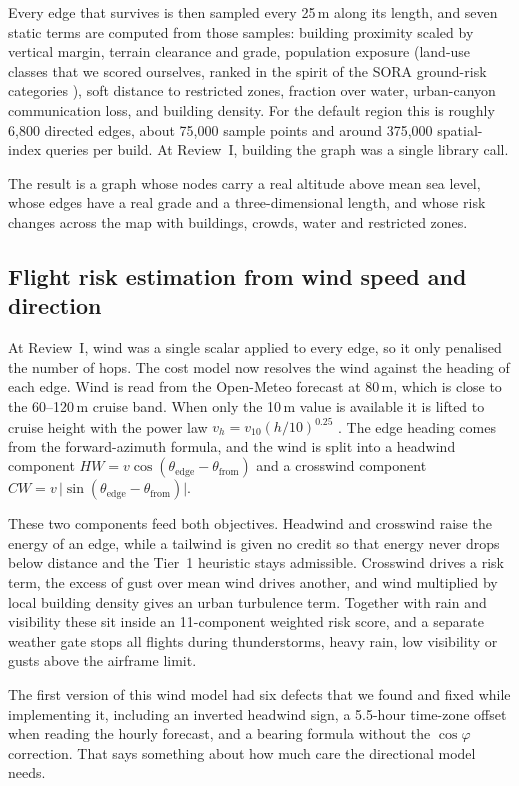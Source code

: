 \documentclass{ssnreview}
\begin{document}
Every edge that survives is then sampled every 25\,m along its length, and seven static
terms are computed from those samples: building proximity scaled by vertical margin,
terrain clearance and grade, population exposure (land-use classes that we
scored ourselves, ranked in the spirit of the SORA ground-risk categories \cite{r22}), soft distance to restricted zones, fraction over water, urban-canyon
communication loss, and building density. For the default region this is roughly 6,800
directed edges, about 75,000 sample points and around 375,000 spatial-index queries per
build. At Review~I, building the graph was a single library call.

The result is a graph whose nodes carry a real altitude above mean sea level, whose
edges have a real grade and a three-dimensional length, and whose risk changes across the
map with buildings, crowds, water and restricted zones.

\subsection{Flight risk estimation from wind speed and direction}

At Review~I, wind was a single scalar applied to every edge, so it only penalised the
number of hops. The cost model now resolves the wind against the heading of each edge.
Wind is read from the Open-Meteo forecast at 80\,m, which is close to the 60--120\,m
cruise band. When only the 10\,m value is available it is lifted to cruise height with
the power law $v_h = v_{10}(h/10)^{0.25}$ \cite{r19}. The edge heading comes from the
forward-azimuth formula, and the wind is split into a headwind component
$H\!W = v\cos(\theta_\mathrm{edge}-\theta_\mathrm{from})$ and a crosswind component
$C\!W = v\,\lvert\sin(\theta_\mathrm{edge}-\theta_\mathrm{from})\rvert$.

These two components feed both objectives. Headwind and crosswind raise the energy of an
edge, while a tailwind is given no credit so that energy never drops below distance and the
Tier~1 heuristic stays admissible. Crosswind drives a risk term, the excess of gust over
mean wind drives another, and wind multiplied by local building density gives an urban
turbulence term. Together with rain and visibility these sit inside an 11-component
weighted risk score, and a separate weather gate stops all flights during thunderstorms,
heavy rain, low visibility or gusts above the airframe limit.

The first version of this wind model had six defects that we found and fixed while
implementing it, including an inverted headwind sign, a 5.5-hour time-zone offset when
reading the hourly forecast, and a bearing formula without the $\cos\varphi$ correction.
That says something about how much care the directional model needs.
\end{document}
